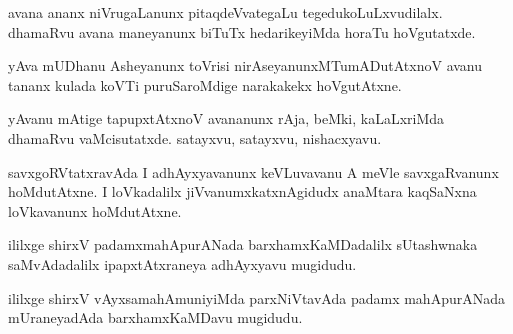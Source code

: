 \begin{mng}
avana ananx niVrugaLanunx pitaqdeVvategaLu tegedukoLuLxvudilalx. dhamaRvu avana maneyanunx biTuTx hedarikeyiMda horaTu hoVgutatxde.
\end{mng}

\begin{mng}
yAva mUDhanu Asheyanunx toVrisi nirAseyanunxMTumADutAtxnoV avanu tananx kulada koVTi puruSaroMdige narakakekx hoVgutAtxne.
\end{mng}

\begin{mng}
yAvanu mAtige tapupxtAtxnoV avananunx rAja, beMki, kaLaLxriMda dhamaRvu vaMcisutatxde. satayxvu, satayxvu, nishacxyavu.
\end{mng}

\begin{mng}
savxgoRVtatxravAda I adhAyxyavanunx keVLuvavanu A meVle savxgaRvanunx hoMdutAtxne. I loVkadalilx jiVvanumxkatxnAgidudx anaMtara kaqSaNxna loVkavanunx hoMdutAtxne. 
\end{mng}
ililxge shirxV padamxmahApurANada barxhamxKaMDadalilx sUtashwnaka saMvAdadalilx ipapxtAtxraneya adhAyxyavu mugidudu.

ililxge shirxV vAyxsamahAmuniyiMda parxNiVtavAda padamx mahApurANada mUraneyadAda barxhamxKaMDavu mugidudu.

